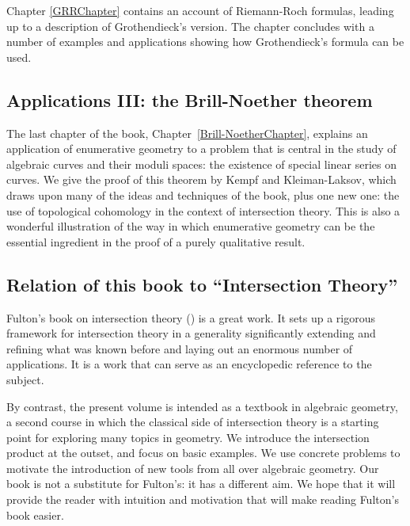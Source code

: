  
Chapter \ref{GRRChapter}
contains an account of Riemann-Roch formulas, leading up to a description of Grothendieck's version.
The chapter concludes with a number of examples and applications showing how Grothendieck's formula can be used.

\subsection{Applications III: the Brill-Noether theorem}

The last chapter of the book, Chapter~\ref{Brill-NoetherChapter}, explains an application of enumerative geometry to a  problem  that is central in the study of algebraic curves and their moduli spaces: the existence of special linear series on curves. We give the proof of this theorem by Kempf and Kleiman-Laksov, which draws upon many of the ideas and techniques of the book, plus one new one: the use of topological cohomology in the context of intersection theory. This is also a wonderful illustration of the way in which enumerative geometry can be the essential ingredient in the proof of a purely qualitative result.

\subsection{Relation of this book to ``Intersection Theory''} 

Fulton's book on intersection theory  (\cite{Fulton1984}) is a great work. It sets up a rigorous framework for intersection theory in a generality significantly extending and refining what was known before and laying out an enormous number of applications. It is a work that can serve as an encyclopedic reference to the subject.

By contrast, the present volume is intended as a textbook in algebraic geometry, a second course in which the classical side of intersection theory is a starting point for exploring many topics in geometry. We introduce the intersection product at the outset,  and focus on basic examples. We use concrete problems to motivate the introduction of new tools from all over algebraic geometry. Our book is not a substitute for Fulton's: it has a different aim. We hope that it will provide the reader with intuition and motivation that will make reading Fulton's book easier.

